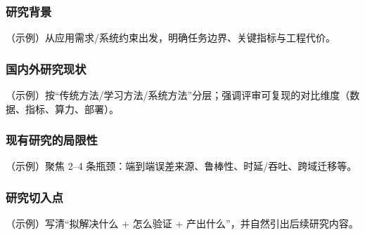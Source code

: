 
\subsubsection{研究背景}
\justifying\indent
（示例）从应用需求/系统约束出发，明确任务边界、关键指标与工程代价。

\subsubsection{国内外研究现状}
\indent
（示例）按“传统方法/学习方法/系统方法”分层；强调评审可复现的对比维度（数据、指标、算力、部署）。

\subsubsection{现有研究的局限性}
\indent
（示例）聚焦 2–4 条瓶颈：端到端误差来源、鲁棒性、时延/吞吐、跨域迁移等。

\subsubsection{研究切入点}
\indent
（示例）写清“拟解决什么 + 怎么验证 + 产出什么”，并自然引出后续研究内容。

